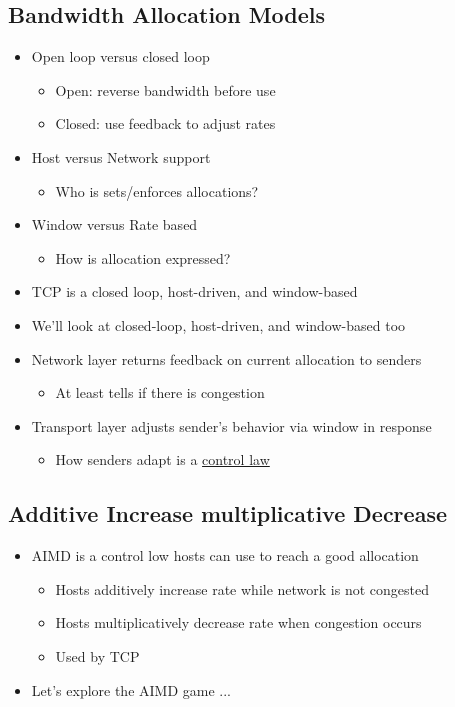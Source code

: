 \documentclass[12pt]{ctexart}   %
\begin{document}
	\subsection{Bandwidth Allocation Models}
	\begin{itemize}
		\item Open loop versus closed loop
		\begin{itemize}
			\item Open: reverse bandwidth before use
			\item Closed: use feedback to adjust rates
		\end{itemize}
		
		\item Host versus Network support
		\begin{itemize}
			\item Who is sets/enforces allocations?
		\end{itemize}
		
		\item Window versus Rate based
		\begin{itemize}
			\item How is allocation expressed?
		\end{itemize}
		
		\item {\color{red} TCP is a closed loop, host-driven, and window-based}
		
		\item We'll look at closed-loop, host-driven, and window-based too
		\item Network layer returns feedback on current allocation to senders
		\begin{itemize}
			\item At least tells if there is congestion
		\end{itemize}
		
		\item Transport layer adjusts sender's behavior via window in response
		\begin{itemize}
			\item How senders adapt is a \underline{control law}
		\end{itemize}
	\end{itemize}
	
	\subsection{Additive Increase multiplicative Decrease}
	\begin{itemize}
		\item AIMD is a control low hosts can use to reach a good allocation
		\begin{itemize}
			\item Hosts additively increase rate while network is not congested
			\item Hosts multiplicatively decrease rate when congestion occurs
			\item Used by TCP
		\end{itemize}
		
		\item Let's explore the AIMD game ...
	\end{itemize}
	
\end{document}
